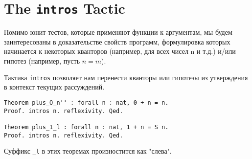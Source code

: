 \documentclass[12pt,a4paper,draft]{article}
\begin{document}
\section{The \texttt{intros} Tactic}

Помимо юнит-тестов, которые применяют функции к аргументам, мы будем заинтересованы в доказательстве свойств программ, формулировка которых начинается к некоторых кванторов (например, для всех чисел n и т.д.) и/или гипотез (например, пусть $n = m$).

Тактика \texttt{intros} позволяет нам перенести кванторы или гипотезы из утверждения в контекст текущих рассуждений.

\begin{verbatim}
Theorem plus_O_n'' : forall n : nat, 0 + n = n.
Proof. intros n. reflexivity. Qed.

Theorem plus_1_l : forall n : nat, 1 + n = S n.
Proof. intros n. reflexivity. Qed.
\end{verbatim}

Суффикс \texttt{\_l} в этих теоремах произностится как "слева".
\end{document}
